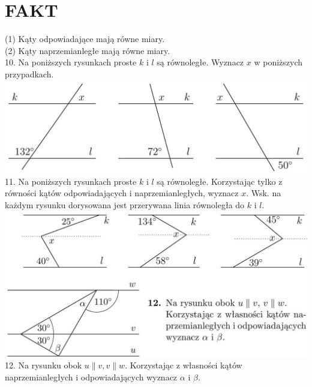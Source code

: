 \documentclass[10pt]{article}
\begin{document}
\section*{FAKT}
(1) Kąty odpowiadające mają równe miary.\\
(2) Kąty naprzemianległe mają równe miary.\\
10. Na poniższych rysunkach proste \(k\) i \(l\) są równoległe. Wyznacz \(x\) w poniższych przypadkach.\\
\includegraphics[max width=\textwidth, center]{2024_11_21_8f01584889ff06348ae7g-189(3)}\\
11. Na poniższych rysunkach proste \(k\) i \(l\) są równoległe. Korzystając tylko z równości kątów odpowiadających i naprzemianległych, wyznacz \(x\). Wsk. na każdym rysunku dorysowana jest przerywana linia równoległa do \(k\) i \(l\).\\
\includegraphics[max width=\textwidth, center]{2024_11_21_8f01584889ff06348ae7g-190}\\
12. Na rysunku obok \(u\|v, v\| w\). Korzystając z własności kątów naprzemianległych i odpowiadających wyznacz \(\alpha\) i \(\beta\).
\end{document}

